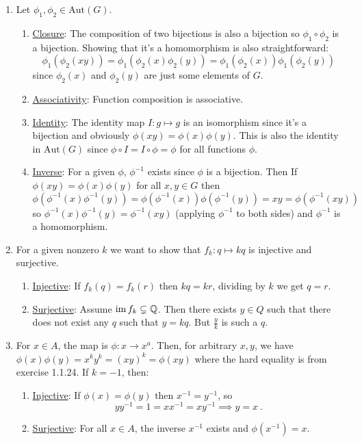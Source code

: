 \documentclass[]{article}
\newcommand{\bbq}{\mathbb{Q}}
\newcommand{\im}{\text{im\,}}
\begin{document}
\begin{enumerate}
\item Let $\phi_1, \phi_2 \in \text{Aut}(G)$.
\begin{enumerate}
\item \underline{Closure}: The composition of two bijections is also a bijection so $\phi_1 \circ \phi_2$ is a bijection. Showing that it's a homomorphism is also straightforward:
\begin{equation}
\phi_1(\phi_2(xy)) = \phi_1(\phi_2(x)\phi_2(y)) = \phi_1(\phi_2(x))\phi_1(\phi_2(y))
\end{equation}
since $\phi_2(x)$ and $\phi_2(y)$ are just some elements of $G$.
\item \underline{Associativity}: Function composition is associative.
\item \underline{Identity}: The identity map $I: g \mapsto g$ is an isomorphism since it's a bijection and obviously $\phi(xy) = \phi(x)\phi(y)$. This is also the identity in $\text{Aut}(G)$ since $\phi \circ I = I \circ \phi = \phi$ for all functions $\phi$.
\item \underline{Inverse}: For a given $\phi$, $\phi^{-1}$ exists since $\phi$ is a bijection. Then If $\phi(xy) = \phi(x)\phi(y)$ for all $x,y \in G$ then 
\begin{equation}
\phi(\phi^{-1}(x)\phi^{-1}(y)) = \phi(\phi^{-1}(x))\phi(\phi^{-1}(y)) = xy = \phi(\phi^{-1}(xy))
\end{equation}
so $\phi^{-1}(x)\phi^{-1}(y) = \phi^{-1}(xy)$ (applying $\phi^{-1}$ to both sides) and $\phi^{-1}$ is a homomorphism.
\end{enumerate}


\item For a given nonzero $k$ we want to show that $f_k: q \mapsto kq$ is injective and surjective.
\begin{enumerate}
\item \underline{Injective}: If $f_k(q) = f_k(r)$ then $kq = kr$, dividing by $k$ we get $q=r$.
\item \underline{Surjective}: Assume $\im f_k \subsetneq \bbq$. Then there exists $y \in Q$ such that there does not exist any $q$ such that $y = kq$. But $\frac{y}{k}$ is such a $q$.
\end{enumerate}


\item For $x \in A$, the map is $\phi: x \to x^a$. Then, for arbitrary $x,y$, we have $\phi(x)\phi(y) = x^ky^k = (xy)^k = \phi(xy)$ where the hard equality is from exercise 1.1.24. If $k=-1$, then:
\begin{enumerate}
\item \underline{Injective}: If $\phi(x) = \phi(y)$ then $x^{-1} = y^{-1}$, so
\begin{equation}
yy^{-1} = 1 = xx^{-1} = xy^{-1} \implies y = x\ .
\end{equation}
\item \underline{Surjective}: For all $x \in A$, the inverse $x^{-1}$ exists and $\phi(x^{-1}) = x$.
\end{enumerate}



\end{enumerate}
\end{document}
